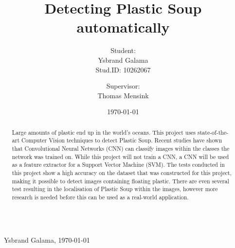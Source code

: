 \documentclass[a4paper, 11pt]{article}
\title{Detecting Plastic Soup automatically}
\author{Student:\\Ysbrand Galama \\ Stud.ID: 10262067 \and Supervisor:\\ Thomas Mensink }
\date{\today}
\begin{document}
\def\showpbreak{1} %

\ifx\showintro\undefined

\thispagestyle{empty}
$\,$
\vfill
\begin{abstract}
Large amounts of plastic end up in the world's oceans.
This project uses state-of-the-art Computer Vision techniques to detect Plastic Soup.
Recent studies have shown that Convolutional Neural Networks (CNN) can classify images within the classes the network was trained on.
While this project will not train a CNN, a CNN will be used as a feature extractor for a Support Vector Machine (SVM).
The tests conducted in this project show a high accuracy on the dataset that was constructed for this project, making it possible to detect images containing floating plastic.
There are even several test resulting in the localisation of Plastic Soup within the images, however more research is needed before this can be used as a real-world application.
\end{abstract}
\vfill
\vfill
$\,$
\newpage
\tableofcontents
\newpage
\else
{}\\ \mbox{}~\hfill{Ysbrand Galama, \today}
\fi


\ifx\showpbreak\undefined \clearpage \fi


\ifx\showpbreak\undefined \clearpage \fi


\ifx\showpbreak\undefined \clearpage \fi


\ifx\showpbreak\undefined \clearpage \fi


\ifx\showpbreak\undefined \clearpage \fi

%




\end{document}
